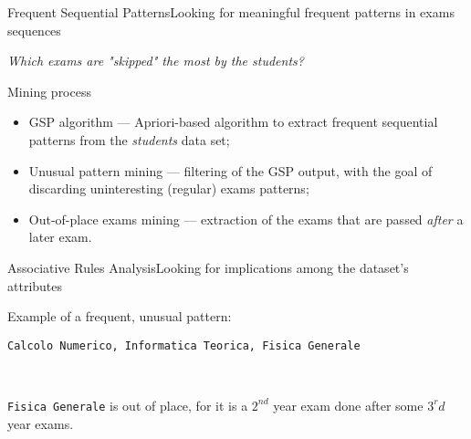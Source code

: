 \begin{frame}{Frequent Sequential Patterns}{Looking for meaningful frequent patterns in exams sequences}

    \centering\textit{Which exams are "skipped" the most by the students?} \vspace{0,3cm}

\begin{block}{Mining process}
		\begin{itemize}
			\item<1-> \alert{GSP algorithm} --- Apriori-based algorithm to extract frequent sequential patterns from the \emph{students} data set;
			\item<2-> \alert{Unusual pattern mining} --- filtering of the GSP output, with the goal of discarding uninteresting (regular) exams patterns;
			\item<3-> \alert{Out-of-place exams mining} --- extraction of the exams that are passed \emph{after} a later exam.
		\end{itemize}
	\end{block}

\end{frame}


\begin{frame}{Associative Rules Analysis}{Looking for implications among the dataset's attributes}

    \alert{Example} of a frequent, unusual pattern: \\

	\vspace{0.3cm}
	\begin{centering}\texttt{Calcolo Numerico, Informatica Teorica, Fisica Generale}\end{centering} \\
	\vspace{0.3cm}

	\texttt{Fisica Generale} is out of place, for it is a $2^{nd}$ year exam done after some $3^r{d}$ year exams.\\

\end{frame}